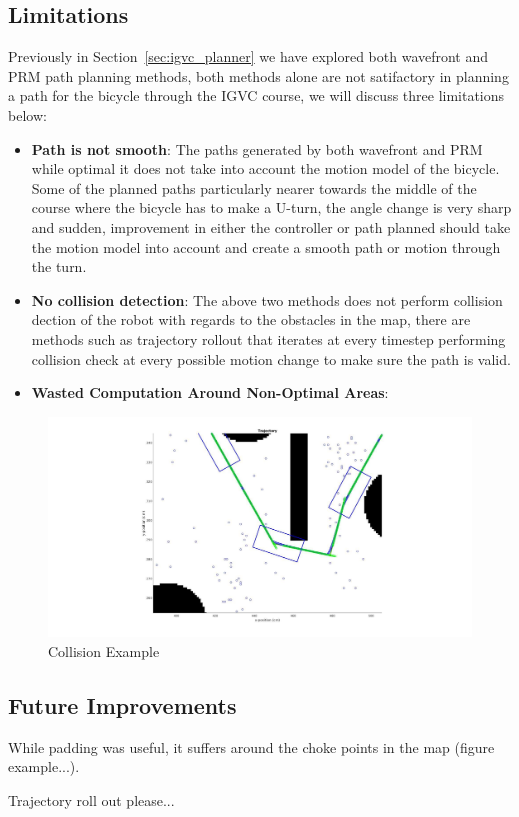 \documentclass{article}
\begin{document}
\subsection{Limitations}
Previously in Section~\ref{sec:igvc_planner} we have explored both wavefront and PRM path planning methods, both methods alone are not satifactory in planning a path for the bicycle through the IGVC course, we will discuss three limitations below:


\begin{itemize}
	\item{\textbf{Path is not smooth}: The paths generated by both wavefront and PRM while optimal it does not take into account the motion model of the bicycle. Some of the planned paths particularly nearer towards the middle of the course where the bicycle has to make a U-turn, the angle change is very sharp and sudden, improvement in either the controller or path planned should take the motion model into account and create a smooth path or motion through the turn.}
	
	\item{\textbf{No collision detection}: The above two methods does not perform collision dection of the robot with regards to the obstacles in the map, there are methods such as trajectory rollout that iterates at every timestep performing collision check at every possible motion change to make sure the path is valid.}
	
	\item{\textbf{Wasted Computation Around Non-Optimal Areas}:}
	
\end{itemize}

\begin{figure}[H]
	\centering
	\includegraphics[width=\linewidth]{images/collision_example.jpg}
	\caption{Collision Example}
	\label{fig:collision_example}
\end{figure}


\subsection{Future Improvements}
While padding was useful, it suffers around the choke points in the map (figure example...).

Trajectory roll out please...
\end{document}

